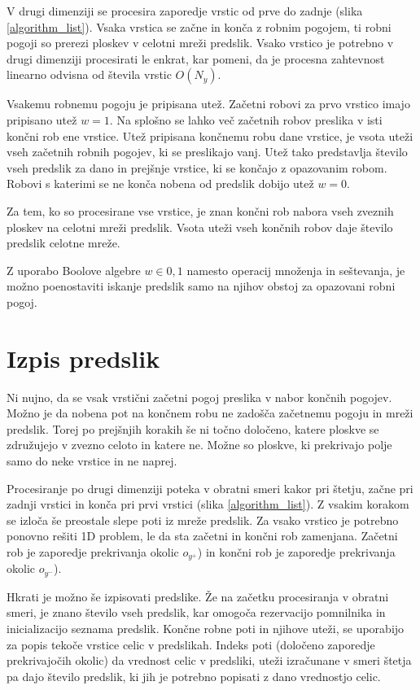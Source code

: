 \documentclass[12pt,a4paper,openany,twoside]{book}
\begin{document}
V drugi dimenziji se procesira zaporedje vrstic od prve do zadnje (slika \ref{algorithm_list}).
Vsaka vrstica se začne in konča z robnim pogojem,
ti robni pogoji so prerezi ploskev v celotni mreži predslik.
Vsako vrstico je potrebno v drugi dimenziji procesirati le enkrat, kar pomeni,
da je procesna zahtevnost linearno odvisna od števila vrstic \(O(N_y)\).

Vsakemu robnemu pogoju je pripisana utež. Začetni robovi za prvo vrstico imajo pripisano utež \(w=1\).
Na splošno se lahko več začetnih robov preslika v isti končni rob ene vrstice.
Utež pripisana končnemu robu dane vrstice, je vsota uteži vseh začetnih robnih pogojev, ki se preslikajo vanj.
Utež tako predstavlja število vseh predslik za dano in prejšnje vrstice, ki se končajo z opazovanim robom.
Robovi s katerimi se ne konča nobena od predslik dobijo utež \(w=0\).

Za tem, ko so procesirane vse vrstice, je znan končni rob nabora vseh zveznih ploskev na celotni mreži predslik.
Vsota uteži vseh končnih robov daje število predslik celotne mreže.

Z uporabo Boolove algebre \(w \in {0, 1}\) namesto operacij množenja in seštevanja,
je možno poenostaviti iskanje predslik samo na njihov obstoj za opazovani robni pogoj.

\section{Izpis predslik}

Ni nujno, da se vsak vrstični začetni pogoj preslika v nabor končnih pogojev.
Možno je da nobena pot na končnem robu ne zadošča začetnemu pogoju in mreži predslik.
Torej po prejšnjih korakih še ni točno določeno, katere ploskve se združujejo v zvezno
celoto in katere ne. Možne so ploskve, ki prekrivajo polje samo do neke vrstice in ne naprej.

Procesiranje po drugi dimenziji poteka v obratni smeri kakor pri štetju,
začne pri zadnji vrstici in konča pri prvi vrstici (slika \ref{algorithm_list}).
Z vsakim korakom se izloča še preostale slepe poti iz mreže predslik.
Za vsako vrstico je potrebno ponovno rešiti 1D problem,
le da sta začetni in končni rob zamenjana.
Začetni rob je zaporedje prekrivanja okolic \(o_{y^+}\))
in končni rob je zaporedje prekrivanja okolic \(o_{y^-}\)).

Hkrati je možno še izpisovati predslike. Že na začetku procesiranja v obratni smeri,
je znano število vseh predslik, kar omogoča rezervacijo pomnilnika in inicializacijo seznama predslik.
Končne robne poti in njihove uteži, se uporabijo za popis tekoče vrstice celic v predslikah.
Indeks poti (določeno zaporedje prekrivajočih okolic) da vrednost celic v predsliki,
uteži izračunane v smeri štetja pa dajo število predslik,
ki jih je potrebno popisati z dano vrednostjo celic.
\end{document}
